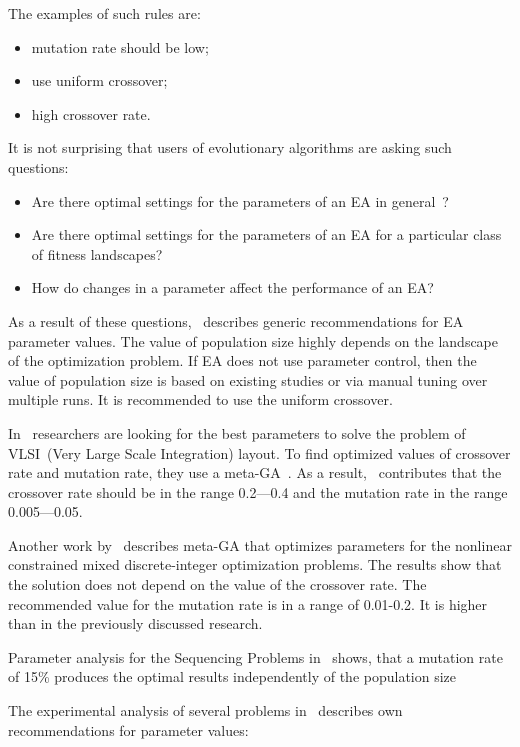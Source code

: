 The examples of such rules are:
\begin{itemize}
	\item mutation rate should be low;
	\item use uniform crossover;
	\item high crossover rate.
\end{itemize}

It is not surprising that users of evolutionary algorithms are asking such questions:
\begin{itemize}
	\item Are there optimal settings for the parameters of an EA in general~\cite{de2007parameter}?
	\item Are there optimal settings for the parameters of an EA for a particular
	class of fitness landscapes?
	\item How do changes in a parameter affect the performance of an EA?
\end{itemize}

As a result of these questions,~\cite{de2007parameter} describes generic recommendations for EA parameter values.
The value of population size highly depends on the landscape of the optimization problem. If EA does not use parameter control, then the value of population size is based on existing studies or via manual tuning over multiple runs. It is recommended to use the uniform crossover. 

In~\cite{shahookar1990genetic} researchers are looking for the best parameters to solve the problem of VLSI~(Very Large Scale Integration) layout. To find optimized values of crossover rate and mutation rate, they use a meta-GA~\cite{clune2005investigations}. As a result,~\cite{shahookar1990genetic} contributes that the crossover rate should be in the range 0.2—0.4 and the mutation rate in the range 0.005—0.05.

Another work by~\cite{wu1995genetic} describes meta-GA that optimizes parameters for the nonlinear constrained mixed discrete-integer optimization problems. The results show that the solution does not depend on the value of the crossover rate.
The recommended value for the mutation rate is in a range of 0.01-0.2. It is higher than in the previously discussed research.

Parameter analysis for the Sequencing Problems in~\cite{gockel1997influencing} shows, that a mutation
rate of 15\% produces the optimal results independently of the population size

The experimental analysis of several problems in~\cite{sipper2018investigating} describes own recommendations for parameter values: 

